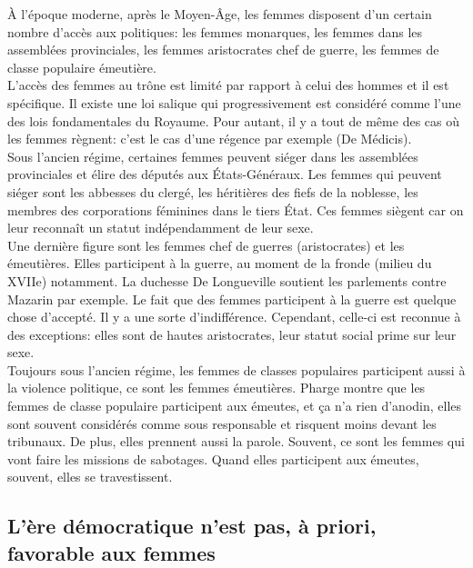 \documentclass[10pt, a4paper, openany]{book}
\begin{document}
À l'époque moderne, après le Moyen-Âge, les femmes disposent d'un certain nombre d'accès aux politiques: les femmes monarques, les femmes dans les assemblées provinciales, les femmes aristocrates chef de guerre, les femmes de classe populaire émeutière. \\
L'accès des femmes au trône est limité par rapport à celui des hommes et il est spécifique. Il existe une loi salique qui progressivement est considéré comme l'une des lois fondamentales du Royaume. Pour autant, il y a tout de même des cas où les femmes règnent: c'est le cas d'une régence par exemple (De Médicis). \\
Sous l'ancien régime, certaines femmes peuvent siéger dans les assemblées provinciales et élire des députés aux États-Généraux. Les femmes qui peuvent siéger sont les abbesses du clergé, les héritières des fiefs de la noblesse, les membres des corporations féminines dans le tiers État. Ces femmes siègent car on leur reconnaît un statut indépendamment de leur sexe. \\
Une dernière figure sont les femmes chef de guerres (aristocrates) et les émeutières. Elles participent à la guerre, au moment de la fronde (milieu du XVIIe) notamment. La duchesse De Longueville soutient les parlements contre Mazarin par exemple. Le fait que des femmes participent à la guerre est quelque chose d'accepté. Il y a une sorte d'indifférence. Cependant, celle-ci est reconnue à des exceptions: elles sont de hautes aristocrates, leur statut social prime sur leur sexe. \\
Toujours sous l'ancien régime, les femmes de classes populaires participent aussi à la violence politique, ce sont les femmes émeutières. Pharge montre que les femmes de classe populaire participent aux émeutes, et ça n'a rien d'anodin, elles sont souvent considérés comme sous responsable et risquent moins devant les tribunaux. De plus, elles prennent aussi la parole. Souvent, ce sont les femmes qui vont faire les missions de sabotages. Quand elles participent aux émeutes, souvent, elles se travestissent. 

\subsection{L'ère démocratique n'est pas, à priori, favorable aux femmes}
\end{document}
